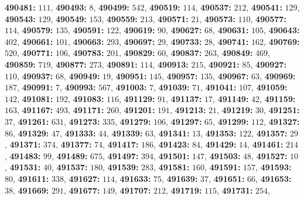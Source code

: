 \textsf{\bfseries 490481:} $111$, \textsf{\bfseries 490493:} $8$, \textsf{\bfseries 490499:} $542$, \textsf{\bfseries 490519:} $114$, \textsf{\bfseries 490537:} $212$, \textsf{\bfseries 490541:} $129$, \textsf{\bfseries 490543:} $129$, \textsf{\bfseries 490549:} $153$, \textsf{\bfseries 490559:} $213$, \textsf{\bfseries 490571:} $21$, \textsf{\bfseries 490573:} $110$, \textsf{\bfseries 490577:} $114$, \textsf{\bfseries 490579:} $135$, \textsf{\bfseries 490591:} $122$, \textsf{\bfseries 490619:} $90$, \textsf{\bfseries 490627:} $68$, \textsf{\bfseries 490631:} $105$, \textsf{\bfseries 490643:} $402$, \textsf{\bfseries 490661:} $101$, \textsf{\bfseries 490663:} $293$, \textsf{\bfseries 490697:} $29$, \textsf{\bfseries 490733:} $28$, \textsf{\bfseries 490741:} $162$, \textsf{\bfseries 490769:} $520$, \textsf{\bfseries 490771:} $106$, \textsf{\bfseries 490783:} $201$, \textsf{\bfseries 490829:} $60$, \textsf{\bfseries 490837:} $263$, \textsf{\bfseries 490849:} $469$, \textsf{\bfseries 490859:} $719$, \textsf{\bfseries 490877:} $273$, \textsf{\bfseries 490891:} $114$, \textsf{\bfseries 490913:} $215$, \textsf{\bfseries 490921:} $85$, \textsf{\bfseries 490927:} $110$, \textsf{\bfseries 490937:} $68$, \textsf{\bfseries 490949:} $19$, \textsf{\bfseries 490951:} $145$, \textsf{\bfseries 490957:} $135$, \textsf{\bfseries 490967:} $63$, \textsf{\bfseries 490969:} $187$, \textsf{\bfseries 490991:} $7$, \textsf{\bfseries 490993:} $567$, \textsf{\bfseries 491003:} $7$, \textsf{\bfseries 491039:} $71$, \textsf{\bfseries 491041:} $107$, \textsf{\bfseries 491059:} $142$, \textsf{\bfseries 491081:} $192$, \textsf{\bfseries 491083:} $116$, \textsf{\bfseries 491129:} $91$, \textsf{\bfseries 491137:} $17$, \textsf{\bfseries 491149:} $42$, \textsf{\bfseries 491159:} $163$, \textsf{\bfseries 491167:} $493$, \textsf{\bfseries 491171:} $260$, \textsf{\bfseries 491201:} $191$, \textsf{\bfseries 491213:} $21$, \textsf{\bfseries 491219:} $30$, \textsf{\bfseries 491251:} $37$, \textsf{\bfseries 491261:} $631$, \textsf{\bfseries 491273:} $335$, \textsf{\bfseries 491279:} $106$, \textsf{\bfseries 491297:} $65$, \textsf{\bfseries 491299:} $112$, \textsf{\bfseries 491327:} $86$, \textsf{\bfseries 491329:} $47$, \textsf{\bfseries 491333:} $44$, \textsf{\bfseries 491339:} $63$, \textsf{\bfseries 491341:} $13$, \textsf{\bfseries 491353:} $122$, \textsf{\bfseries 491357:} $29$, \textsf{\bfseries 491371:} $374$, \textsf{\bfseries 491377:} $74$, \textsf{\bfseries 491417:} $186$, \textsf{\bfseries 491423:} $84$, \textsf{\bfseries 491429:} $14$, \textsf{\bfseries 491461:} $214$, \textsf{\bfseries 491483:} $99$, \textsf{\bfseries 491489:} $675$, \textsf{\bfseries 491497:} $394$, \textsf{\bfseries 491501:} $147$, \textsf{\bfseries 491503:} $48$, \textsf{\bfseries 491527:} $10$, \textsf{\bfseries 491531:} $40$, \textsf{\bfseries 491537:} $180$, \textsf{\bfseries 491539:} $283$, \textsf{\bfseries 491581:} $160$, \textsf{\bfseries 491591:} $157$, \textsf{\bfseries 491593:} $80$, \textsf{\bfseries 491611:} $338$, \textsf{\bfseries 491627:} $114$, \textsf{\bfseries 491633:} $75$, \textsf{\bfseries 491639:} $37$, \textsf{\bfseries 491651:} $66$, \textsf{\bfseries 491653:} $38$, \textsf{\bfseries 491669:} $291$, \textsf{\bfseries 491677:} $149$, \textsf{\bfseries 491707:} $212$, \textsf{\bfseries 491719:} $115$, \textsf{\bfseries 491731:} $254$, 
